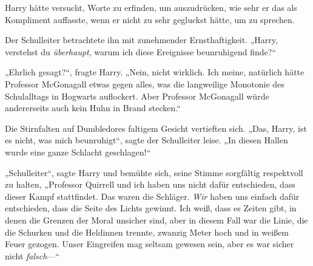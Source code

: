 Harry hätte versucht, Worte zu erfinden, um auszudrücken, wie sehr er das als Kompliment auffasste, wenn er nicht zu sehr gegluckst hätte, um zu sprechen.

Der Schulleiter betrachtete ihn mit zunehmender Ernsthaftigkeit. „Harry, verstehst du \emph{überhaupt}, warum ich diese Ereignisse beunruhigend finde?“

„Ehrlich gesagt?“, fragte Harry. „Nein, nicht wirklich. Ich meine, natürlich hätte Professor McGonagall etwas gegen alles, was die langweilige Monotonie des Schulalltags in Hogwarts auflockert. Aber Professor McGonagall würde andererseits auch kein Huhn in Brand stecken.“

Die Stirnfalten auf Dumbledores faltigem Gesicht vertieften sich. „Das, Harry, ist es nicht, was mich beunruhigt“, sagte der Schulleiter leise. „In diesen Hallen wurde eine ganze Schlacht geschlagen!“

„Schulleiter“, sagte Harry und bemühte sich, seine Stimme sorgfältig respektvoll zu halten, „Professor Quirrell und ich haben uns nicht dafür entschieden, dass dieser Kampf stattfindet. Das waren die Schläger. \emph{Wir} haben uns einfach dafür entschieden, dass die Seite des Lichts gewinnt. Ich weiß, dass es Zeiten gibt, in denen die Grenzen der Moral unsicher sind, aber in diesem Fall war die Linie, die die Schurken und die Heldinnen trennte, zwanzig Meter hoch und in weißem Feuer gezogen. Unser Eingreifen mag seltsam gewesen sein, aber es war sicher nicht \emph{falsch}—“

